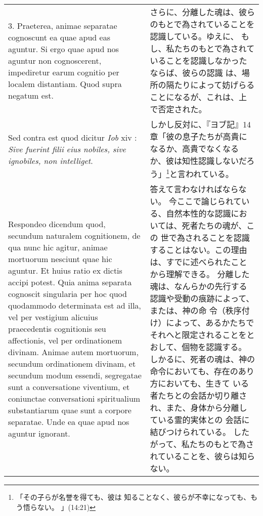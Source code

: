 \documentclass[10pt]{jsarticle} %
\begin{document}
\begin{longtable}{p{21em}p{21em}}
\\




3. {\sc Praeterea}, animae separatae cognoscunt ea
 quae apud eas aguntur. Si ergo quae apud nos aguntur non cognoscerent,
 impediretur earum cognitio per localem distantiam. Quod supra negatum
 est.

&
さらに、分離した魂は、彼らのもとで為されていることを認識している。ゆえに、
 もし、私たちのもとで為されていることを認識しなかったならば、彼らの認識
 は、場所の隔たりによって妨げらることになるが、これは、上で否定された。

\\




{\sc Sed contra est} quod dicitur {\it Iob} {\sc xiv} : {\it Sive fuerint
 filii eius nobiles, sive ignobiles, non intelliget}.

&
しかし反対に、『ヨブ記』14章「彼の息子たちが高貴になるか、高貴でなくなる
 か、彼は知性認識しないだろう」\footnote{「その子らが名誉を得ても、彼は
 知ることなく、彼らが不幸になっても、もう悟らない。
」(14:21)}と言われている。


\\


{\sc Respondeo dicendum} quod, secundum naturalem
 cognitionem, de qua nunc hic agitur, animae mortuorum nesciunt quae hic
 aguntur. Et huius ratio ex dictis accipi potest. Quia anima separata
 cognoscit singularia per hoc quod quodammodo determinata est ad illa,
 vel per vestigium alicuius praecedentis cognitionis seu affectionis,
 vel per ordinationem divinam. Animae autem mortuorum, secundum
 ordinationem divinam, et secundum modum essendi, segregatae sunt a
 conversatione viventium, et coniunctae conversationi spiritualium
 substantiarum quae sunt a corpore separatae. Unde ea quae apud nos
 aguntur ignorant. 

&
答えて言わなければならない。
今ここで論じられている、自然本性的な認識においては、死者たちの魂が、この
 世で為されることを認識することはない。この理由は、すでに述べられたこと
 から理解できる。
分離した魂は、なんらかの先行する認識や受動の痕跡によって、または、神の命
 令（秩序付け）によって、あるかたちでそれへと限定されることをとおして、個物を認識する。
しかるに、死者の魂は、神の命令においても、存在のあり方においても、生きて
 いる者たちとの会話か切り離され、また、身体から分離している霊的実体との
 会話に結びつけられている。
したがって、私たちのもとで為されていることを、彼らは知らない。


\\




\end{longtable}
\end{document}
